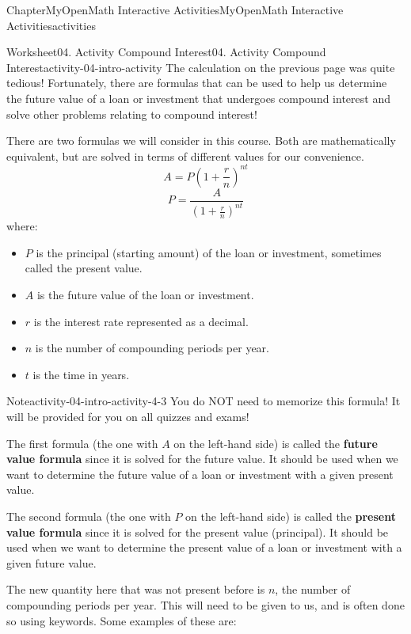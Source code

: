 \documentclass[oneside,10pt,]{book}
\newcommand{\ptxlistdisc}{\raisebox{0.3ex}{\textbullet}}
\newcommand{\terminology}[1]{\textbf{#1}}
\begin{document}
\begin{chapterptx}{Chapter}{MyOpenMath Interactive Activities}{}{MyOpenMath Interactive Activities}{}{}{activities}
\begin{worksheet-section}{Worksheet}{04. Activity Compound Interest}{}{04. Activity Compound Interest}{}{}{activity-04-intro-activity}
\clearpage
The calculation on the previous page was quite tedious! Fortunately, there are formulas that can be used to help us determine the future value of a loan or investment that undergoes compound interest and solve other problems relating to compound interest!%
\par
There are two formulas we will consider in this course. Both are mathematically equivalent, but are solved in terms of different values for our convenience.%
\begin{equation*}
A = P\left(1 + \frac{r}{n}\right)^{nt}
\end{equation*}
%
\begin{equation*}
P = \frac{A}{\left(1 + \frac{r}{n}\right)^{nt}}
\end{equation*}
where:%
\begin{itemize}[label=\ptxlistdisc]
\item{}\(P\) is the principal (starting amount) of the loan or investment, sometimes called the present value.%
\item{}\(A\) is the future value of the loan or investment.%
\item{}\(r\) is the interest rate represented as a decimal.%
\item{}\(n\) is the number of compounding periods per year.%
\item{}\(t\) is the time in years.%
\end{itemize}
%
\begin{note}{Note}{}{activity-04-intro-activity-4-3}%
You do NOT need to memorize this formula! It will be provided for you on all quizzes and exams!%
\end{note}
The first formula (the one with \(A\) on the left-hand side) is called the \terminology{future value formula} since it is solved for the future value. It should be used when we want to determine the future value of a loan or investment with a given present value.%
\par
The second formula (the one with \(P\) on the left-hand side) is called the \terminology{present value formula} since it is solved for the present value (principal). It should be used when we want to determine the present value of a loan or investment with a given future value.%
\par
The new quantity here that was not present before is \(n\), the number of compounding periods per year. This will need to be given to us, and is often done so using keywords. Some examples of these are:%
\begin{itemize}[label=\ptxlistdisc]

\end{itemize}
\end{worksheet-section}
\end{chapterptx}
\end{document}
